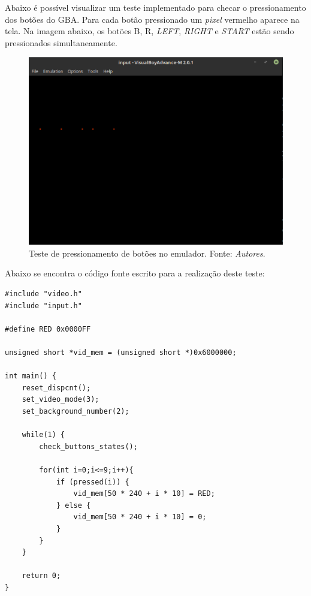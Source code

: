 Abaixo é possível visualizar um teste implementado para checar o pressionamento dos botões do GBA. Para cada botão pressionado um \textit{pixel} vermelho aparece na tela. Na imagem abaixo, os botões B, R, \textit{LEFT}, \textit{RIGHT} e \textit{START} estão sendo pressionados simultaneamente.

\begin{figure}[H]
 \centering \includegraphics[keepaspectratio=true,scale=0.6]{figuras/demo-input.eps}
   \caption[Demonstração do pressionamento de botões no emulador]
    {Teste de pressionamento de botões no emulador. Fonte: \textit{Autores}.}
   \label{demo-input}
\end{figure}

Abaixo se encontra o código fonte escrito para a realização deste teste:

\vspace{\onelineskip}
\begin{lstlisting}[float,caption={Código de teste de \textit{input}.}]
#include "video.h"
#include "input.h"

#define RED 0x0000FF

unsigned short *vid_mem = (unsigned short *)0x6000000;

int main() {
    reset_dispcnt();
    set_video_mode(3);
    set_background_number(2);

    while(1) {
        check_buttons_states();

        for(int i=0;i<=9;i++){
            if (pressed(i)) {
                vid_mem[50 * 240 + i * 10] = RED;
            } else {
                vid_mem[50 * 240 + i * 10] = 0;
            }
        }
    }

    return 0;
}
\end{lstlisting}
\vspace{\onelineskip}
